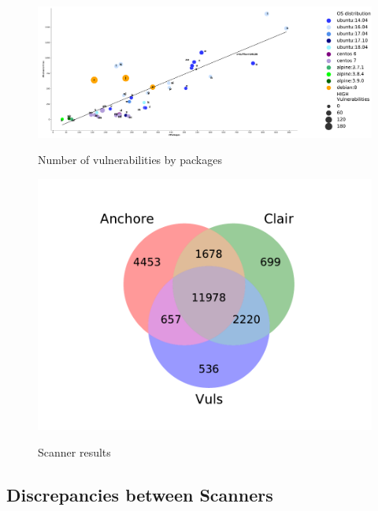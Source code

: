 \documentclass[a4paper,num-refs]{oup-contemporary}
\begin{document}
\begin{figure}
        {\includegraphics[scale=1.5,width=\textwidth]
        {Figures/vulngraph.pdf}}
	\vspace*{-7mm}
        \caption{\label{fig:graph1} Number of vulnerabilities by packages}
      \end{figure}

\begin{figure}
        {\includegraphics[scale=2.5,width=\columnwidth]
        {Figures/venn.pdf}}
	\vspace*{-10mm}
	\caption{\label{fig:venn} Scanner results}
\end{figure}

\subsection{Discrepancies between Scanners}
\end{document}
